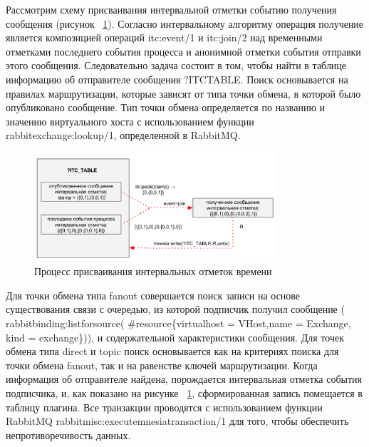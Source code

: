 {Рассмотрим схему присваивания интервальной отметки событию получения сообщения (рисунок ~\ref{fig:send_recv}). Согласно интервальному алгоритму операция получение является композицией операций itc:event/1 и itc:join/2 над временными отметками последнего события процесса и анонимной отметки события отправки этого сообщения. Следовательно задача состоит в том, чтобы найти в таблице информацию об отправителе сообщения ?ITC\underline{\hspace{0.25cm}}TABLE. Поиск основывается на правилах маршрутизации, которые зависят от типа точки обмена, в которой было опубликовано сообщение. Тип точки обмена определяется по названию и значению виртуального хоста с использованием функции rabbit\underline{\hspace{0.25cm}}exchange:lookup/1, определенной в RabbitMQ.
\begin{figure}
\centering
\includegraphics[width=0.8\textwidth]{img/send_recv2.png}
\caption{Процесс присваивания интервальных отметок времени}
\label{fig:send_recv}
\end{figure}
Для точки обмена типа fanout совершается поиск записи на основе существования связи с очередью, из которой подписчик получил сообщение ( rabbit\underline{\hspace{0.25cm}}binding:list\underline{\hspace{0.25cm}}for\underline{\hspace{0.25cm}}source( \#resource\{virtual\underline{\hspace{0.25cm}}host = VHost,name = Exchange, kind = exchange\})), и содержательной характеристики сообщения. Для точек обмена типа direct и topic поиск основывается как на критериях поиска для точки обмена fanout, так и на равенстве ключей маршрутизации. Когда информация об отправителе найдена, порождается интервальная отметка события подписчика, и, как показано на рисунке ~\ref{fig:send_recv}, сформированная запись помещается в таблицу плагина. Все транзакции проводятся с использованием функции RabbitMQ rabbit\underline{\hspace{0.25cm}}misc:execute\underline{\hspace{0.25cm}}mnesia\underline{\hspace{0.25cm}}transaction/1 для того, чтобы обеспечить непротиворечивость данных.

}
